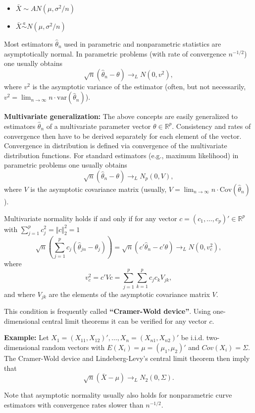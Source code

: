 \documentclass[]{book}
\providecommand{\tightlist}{%
  \setlength{\itemsep}{0pt}\setlength{\parskip}{0pt}}
\theoremstyle{definition}
\theoremstyle{definition}
\theoremstyle{definition}
\theoremstyle{remark}
\begin{document}
\begin{itemize}
\tightlist
\item
  \(\bar X\sim AN(\mu,\sigma^2/n)\)
\item
  \(\bar X\overset{a}{\sim}N(\mu,\sigma^2/n)\)
\end{itemize}

Most estimators \(\hat\theta_n\) used in parametric and nonparametric statistics are asymptotically normal. In parametric problems (with rate of convergence \(n^{-1/2}\)) one usually obtains
\[\sqrt{n}(\hat\theta_n -\theta )\to_L N(0,v^2),\]
where \(v^2\) is the asymptotic variance of the estimator (often, but not necessarily, \(v^2=\lim_{n\to\infty} n\cdot\textrm{var}(\hat\theta_n)\)).

\textbf{Multivariate generalization:} The above concepts are easily generalized to estimators \(\hat\theta_n\) of a multivariate parameter vector \(\theta\in\mathbb{R}^p\). Consistency and rates of convergence then have to be derived separately for each element of the vector. Convergence in distribution is defined via convergence of the multivariate distribution functions. For standard estimators (e.g., maximum likelihood) in parametric problems one usually obtains
\[\sqrt{n}(\hat\theta_n -\theta )\to_L N_p(0,V),\]
where \(V\) is the asymptotic covariance matrix (usually, \(V=\lim_{n\to\infty} n\cdot\textrm{Cov}(\hat\theta_n)\)).

Multivariate normality holds if and only if for any vector \(c=(c_1,\dots,c_p)'\in\mathbb{R}^p\) with \(\sum_{j=1}^p c_j^2=\Vert c\Vert_2^2=1\)
\[\sqrt{n}\left(\sum_{j=1}^p c_j (\hat\theta_{jn} -\theta_j)\right)=\sqrt{n}\left(c'\hat\theta_n-c'\theta\right)\to_L N\left(0,v_c^2\right),\]
where
\[v_c^2=c'Vc=\sum_{j=1}^p\sum_{k=1}^p c_jc_k V_{jk},\]
and where \(V_{jk}\) are the elements of the asymptotic covariance matrix \(V\).

This condition is frequently called \textbf{``Cramer-Wold device''}. Using one-dimensional central limit theorems it can be verified for any vector \(c\).

\textbf{Example:} Let \(X_1=(X_{11},X_{12})',\dots,X_n=(X_{n1},X_{n2})'\) be i.i.d. two-dimensional random vectors with \(E(X_i)=\mu=(\mu_1,\mu_2)'\) and \(Cov(X_i)=\Sigma\). The Cramer-Wold device and Lindeberg-Levy's central limit theorem then imply that
\[\sqrt{n}\left(\bar X -\mu\right)\to_L N_2\left(0,\Sigma\right).\]

Note that asymptotic normality usually also holds for nonparametric curve estimators with convergence rates slower than \(n^{-1/2}\).
\end{document}
